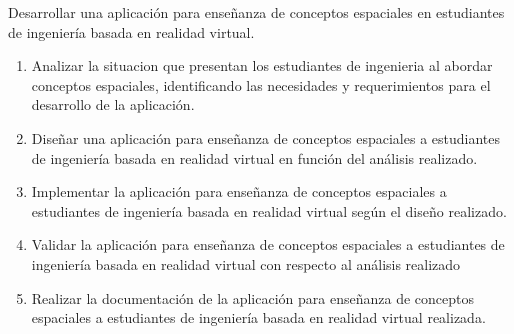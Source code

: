 

Desarrollar una aplicación para enseñanza de conceptos espaciales en estudiantes de ingeniería basada en realidad virtual.


\newcommand{\oeOne}{Analizar la situacion que presentan los estudiantes de ingenieria al abordar conceptos espaciales, identificando las necesidades y requerimientos para el desarrollo de la aplicación.}
\newcommand{\oeTwo}{Diseñar una aplicación para enseñanza de conceptos espaciales a estudiantes de ingeniería basada en realidad virtual en función del análisis realizado.}
\newcommand{\oeThree}{Implementar la aplicación para enseñanza de conceptos espaciales a estudiantes de ingeniería basada en realidad virtual según el diseño realizado.}
\newcommand{\oeFour}{Validar la aplicación para enseñanza de conceptos espaciales a estudiantes de ingeniería basada en realidad virtual con respecto al análisis realizado}
\newcommand{\oeFive}{Realizar la documentación de la aplicación para enseñanza de conceptos espaciales a estudiantes de ingeniería basada en realidad virtual realizada.}
\begin{enumerate}
  \item \oeOne
  \item \oeTwo
  \item \oeThree
  \item \oeFour
  \item \oeFive
\end{enumerate}
